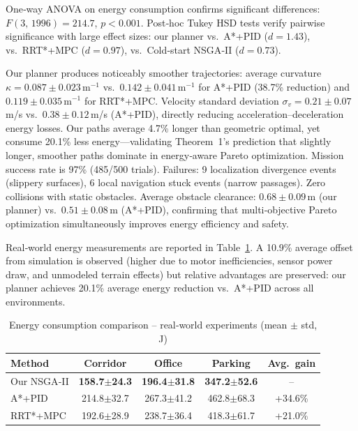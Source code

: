 \documentclass[lettersize,journal]{IEEEtran}
\begin{document}
One‑way ANOVA on energy consumption confirms significant differences:
$F(3,\,1996)=214.7$, $p<0.001$. Post‑hoc Tukey HSD tests verify pairwise
significance with large effect sizes: our planner vs.\ A*+PID ($d=1.43$),
vs.\ RRT*+MPC ($d=0.97$), vs.\ Cold‑start NSGA‑II ($d=0.73$).

Our planner produces noticeably smoother trajectories: average curvature
$\kappa=0.087\pm0.023$\,m$^{-1}$ vs.\ $0.142\pm0.041$\,m$^{-1}$ for A*+PID
(38.7\% reduction) and $0.119\pm0.035$\,m$^{-1}$ for RRT*+MPC. Velocity
standard deviation $\sigma_v = 0.21\pm0.07$\,m/s vs.\ $0.38\pm0.12$\,m/s
(A*+PID), directly reducing acceleration–deceleration energy losses. Our
paths average 4.7\% longer than geometric optimal, yet consume 20.1\% less
energy—validating Theorem~1's prediction that slightly longer, smoother paths
dominate in energy‑aware Pareto optimization. Mission success rate is 97\%
(485/500 trials). Failures: 9 localization divergence events (slippery
surfaces), 6 local navigation stuck events (narrow passages). Zero collisions
with static obstacles. Average obstacle clearance: $0.68\pm0.09$\,m (our
planner) vs.\ $0.51\pm0.08$\,m (A*+PID), confirming that multi‑objective
Pareto optimization simultaneously improves energy efficiency and safety.

Real‑world energy measurements are reported in Table~\ref{tab:real_energy}. A
10.9\% average offset from simulation is observed (higher due to motor
inefficiencies, sensor power draw, and unmodeled terrain effects) but relative
advantages are preserved: our planner achieves 20.1\% average energy reduction
vs.\ A*+PID across all environments.

\begin{table}[t]
\centering
\caption{Energy consumption comparison -- real‑world experiments (mean $\pm$ std, J)}
\label{tab:real_energy}
\begin{tabular}{lcccc}
\toprule
\textbf{Method} & \textbf{Corridor} & \textbf{Office} & \textbf{Parking}
                & \textbf{Avg.\ gain} \\
\midrule
Our NSGA‑II      & \textbf{158.7$\pm$24.3} & \textbf{196.4$\pm$31.8}
                  & \textbf{347.2$\pm$52.6} & -- \\
A*+PID            & 214.8$\pm$32.7 & 267.3$\pm$41.2 & 462.8$\pm$68.3
                  & +34.6\% \\
RRT*+MPC          & 192.6$\pm$28.9 & 238.7$\pm$36.4 & 418.3$\pm$61.7
                  & +21.0\% \\
\bottomrule
\end{tabular}
\end{table}
\end{document}

